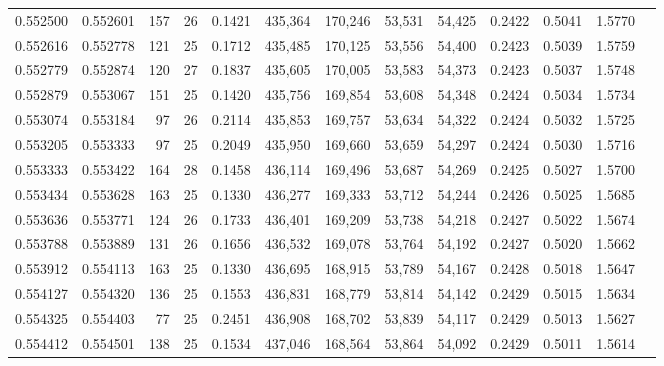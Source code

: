 \begin{tabular}{rrrrrrrrrrrrr}
0.552500 & 0.552601 &    157 &    26 &                                     0.1421 & 435,364 & 170,246 &  53,531 &  54,425 & 0.2422 & 0.5041 & 1.5770 \\
0.552616 & 0.552778 &    121 &    25 &                                     0.1712 & 435,485 & 170,125 &  53,556 &  54,400 & 0.2423 & 0.5039 & 1.5759 \\
0.552779 & 0.552874 &    120 &    27 &                                     0.1837 & 435,605 & 170,005 &  53,583 &  54,373 & 0.2423 & 0.5037 & 1.5748 \\
0.552879 & 0.553067 &    151 &    25 &                                     0.1420 & 435,756 & 169,854 &  53,608 &  54,348 & 0.2424 & 0.5034 & 1.5734 \\
0.553074 & 0.553184 &     97 &    26 &                                     0.2114 & 435,853 & 169,757 &  53,634 &  54,322 & 0.2424 & 0.5032 & 1.5725 \\
0.553205 & 0.553333 &     97 &    25 &                                     0.2049 & 435,950 & 169,660 &  53,659 &  54,297 & 0.2424 & 0.5030 & 1.5716 \\
0.553333 & 0.553422 &    164 &    28 &                                     0.1458 & 436,114 & 169,496 &  53,687 &  54,269 & 0.2425 & 0.5027 & 1.5700 \\
0.553434 & 0.553628 &    163 &    25 &                                     0.1330 & 436,277 & 169,333 &  53,712 &  54,244 & 0.2426 & 0.5025 & 1.5685 \\
0.553636 & 0.553771 &    124 &    26 &                                     0.1733 & 436,401 & 169,209 &  53,738 &  54,218 & 0.2427 & 0.5022 & 1.5674 \\
0.553788 & 0.553889 &    131 &    26 &                                     0.1656 & 436,532 & 169,078 &  53,764 &  54,192 & 0.2427 & 0.5020 & 1.5662 \\
0.553912 & 0.554113 &    163 &    25 &                                     0.1330 & 436,695 & 168,915 &  53,789 &  54,167 & 0.2428 & 0.5018 & 1.5647 \\
0.554127 & 0.554320 &    136 &    25 &                                     0.1553 & 436,831 & 168,779 &  53,814 &  54,142 & 0.2429 & 0.5015 & 1.5634 \\
0.554325 & 0.554403 &     77 &    25 &                                     0.2451 & 436,908 & 168,702 &  53,839 &  54,117 & 0.2429 & 0.5013 & 1.5627 \\
0.554412 & 0.554501 &    138 &    25 &                                     0.1534 & 437,046 & 168,564 &  53,864 &  54,092 & 0.2429 & 0.5011 & 1.5614 \\

\end{tabular}
